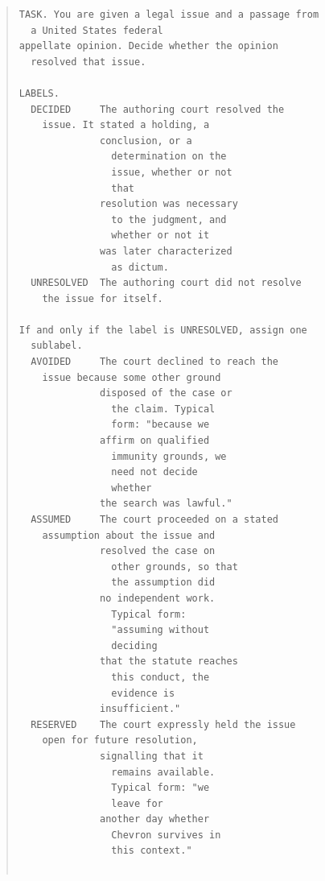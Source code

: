 \begin{quote}\scriptsize\begin{verbatim}
TASK. You are given a legal issue and a passage from
  a United States federal
appellate opinion. Decide whether the opinion
  resolved that issue.

LABELS.
  DECIDED     The authoring court resolved the
    issue. It stated a holding, a
              conclusion, or a
                determination on the
                issue, whether or not
                that
              resolution was necessary
                to the judgment, and
                whether or not it
              was later characterized
                as dictum.
  UNRESOLVED  The authoring court did not resolve
    the issue for itself.

If and only if the label is UNRESOLVED, assign one
  sublabel.
  AVOIDED     The court declined to reach the
    issue because some other ground
              disposed of the case or
                the claim. Typical
                form: "because we
              affirm on qualified
                immunity grounds, we
                need not decide
                whether
              the search was lawful."
  ASSUMED     The court proceeded on a stated
    assumption about the issue and
              resolved the case on
                other grounds, so that
                the assumption did
              no independent work.
                Typical form:
                "assuming without
                deciding
              that the statute reaches
                this conduct, the
                evidence is
              insufficient."
  RESERVED    The court expressly held the issue
    open for future resolution,
              signalling that it
                remains available.
                Typical form: "we
                leave for
              another day whether
                Chevron survives in
                this context."


\end{verbatim}
\end{quote}

